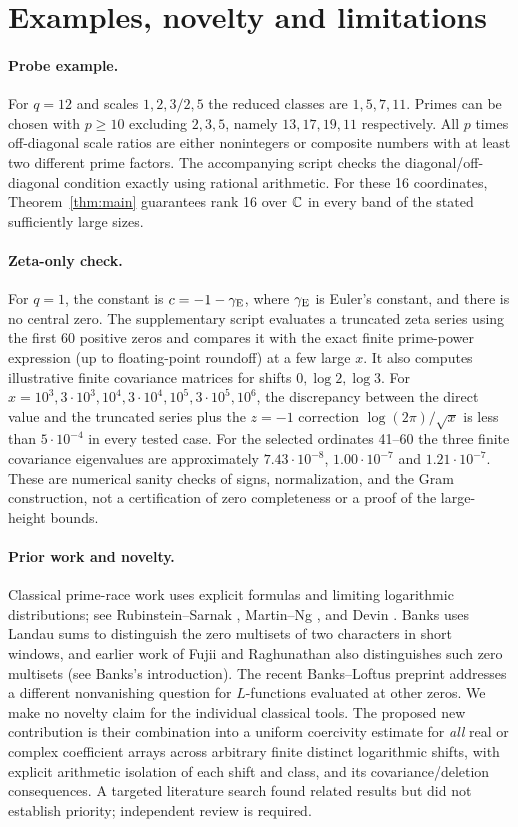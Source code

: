 \documentclass[11pt]{article}
\theoremstyle{remark}\newtheorem{remark}[theorem]{Remark}
\begin{document}
\section{Examples, novelty and limitations}
\paragraph{Probe example.} For $q=12$ and scales $1,2,3/2,5$ the reduced classes are $1,5,7,11$. Primes can be chosen with $p\ge10$ excluding $2,3,5$, namely $13,17,19,11$ respectively. All $p$ times off-diagonal scale ratios are either nonintegers or composite numbers with at least two different prime factors. The accompanying script checks the diagonal/off-diagonal condition exactly using rational arithmetic. For these 16 coordinates, Theorem~\ref{thm:main} guarantees rank 16 over $\mathbb C$ in every band of the stated sufficiently large sizes.

\paragraph{Zeta-only check.} For $q=1$, the constant is $c=-1-\gamma_{\rm E}$, where $\gamma_{\rm E}$ is Euler's constant, and there is no central zero. The supplementary script evaluates a truncated zeta series using the first 60 positive zeros and compares it with the exact finite prime-power expression (up to floating-point roundoff) at a few large $x$. It also computes illustrative finite covariance matrices for shifts $0,\log 2,\log 3$. For $x=10^3,3\cdot10^3,10^4,3\cdot10^4,10^5,3\cdot10^5,10^6$, the discrepancy between the direct value and the truncated series plus the $z=-1$ correction $\log(2\pi)/\sqrt x$ is less than $5\cdot 10^{-4}$ in every tested case. For the selected ordinates 41--60 the three finite covariance eigenvalues are approximately $7.43\cdot10^{-8}$, $1.00\cdot10^{-7}$ and $1.21\cdot10^{-7}$. These are numerical sanity checks of signs, normalization, and the Gram construction, not a certification of zero completeness or a proof of the large-height bounds.

\paragraph{Prior work and novelty.} Classical prime-race work uses explicit formulas and limiting logarithmic distributions; see Rubinstein--Sarnak \cite{rs}, Martin--Ng \cite{mn}, and Devin \cite{devin}. Banks \cite{banks} uses Landau sums to distinguish the zero multisets of two characters in short windows, and earlier work of Fujii and Raghunathan also distinguishes such zero multisets (see Banks's introduction). The recent Banks--Loftus preprint \cite{bl} addresses a different nonvanishing question for $L$-functions evaluated at other zeros. We make no novelty claim for the individual classical tools. The proposed new contribution is their combination into a uniform coercivity estimate for \emph{all} real or complex coefficient arrays across arbitrary finite distinct logarithmic shifts, with explicit arithmetic isolation of each shift and class, and its covariance/deletion consequences. A targeted literature search found related results but did not establish priority; independent review is required.
\end{document}
